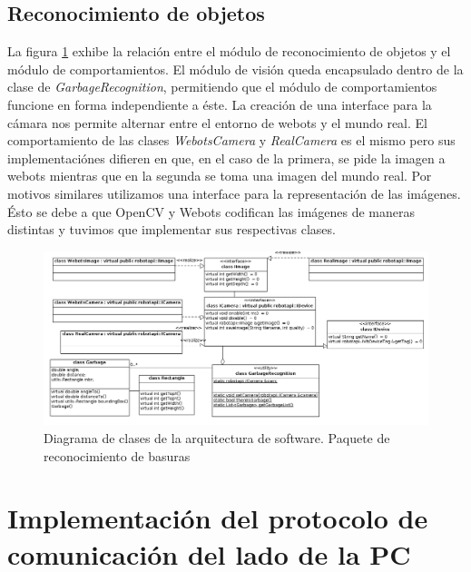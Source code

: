 \subsection{Reconocimiento de objetos}
La figura \ref{fig:soft_arq_reconmodule} exhibe la relaci\'on entre el m\'odulo de reconocimiento de 
objetos y el m\'odulo de comportamientos. El m\'odulo de visi\'on queda encapsulado dentro
de la clase de \textit{GarbageRecognition}, permitiendo que el m\'odulo de comportamientos funcione en
forma independiente a \'este. La creaci\'on de una interface para la c\'amara nos permite alternar
entre el entorno de webots y el mundo real. El comportamiento de las clases \textit{WebotsCamera} y 
\textit{RealCamera} es el mismo pero sus implementaci\'ones difieren en que, en el caso de la primera, se pide
la imagen a webots mientras
que en la segunda se toma una imagen del mundo real. Por motivos similares utilizamos una interface para 
la representaci\'on de las im\'agenes. \'Esto se debe a que OpenCV y Webots codifican las im\'agenes de
maneras distintas y tuvimos que implementar sus respectivas clases. 
\begin{landscape}
\begin{figure}[h]
	\centering
	\includegraphics[scale=0.5]{comportamientos/figures/api3.png}
	\caption[Arquitectura de software: m\'odulo de reconocimiento]{Diagrama de clases de
	la arquitectura de software. Paquete de reconocimiento de basuras}
	\label{fig:soft_arq_reconmodule}
\end{figure}
\end{landscape}

\section[Implementaci\'on del protocolo en PC]{Implementaci\'on del protocolo de comunicaci\'on del lado de la PC}
